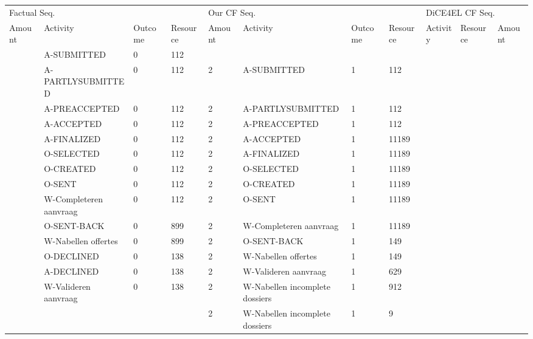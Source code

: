\begin{tabular}{lllllllllll}
\toprule
\multicolumn{4}{l}{Factual Seq.} & \multicolumn{4}{l}{Our CF Seq.} & \multicolumn{3}{l}{DiCE4EL CF Seq.} \\
Amount & Activity & Outcome & Resource & Amount & Activity & Outcome & Resource & Activity & Resource & Amount \\
\midrule
 & A-SUBMITTED & 0 & 112 &  &  &  &  &  &  &  \\
 & A-PARTLYSUBMITTED & 0 & 112 & 2 & A-SUBMITTED & 1 & 112 &  &  &  \\
 & A-PREACCEPTED & 0 & 112 & 2 & A-PARTLYSUBMITTED & 1 & 112 &  &  &  \\
 & A-ACCEPTED & 0 & 112 & 2 & A-PREACCEPTED & 1 & 112 &  &  &  \\
 & A-FINALIZED & 0 & 112 & 2 & A-ACCEPTED & 1 & 11189 &  &  &  \\
 & O-SELECTED & 0 & 112 & 2 & A-FINALIZED & 1 & 11189 &  &  &  \\
 & O-CREATED & 0 & 112 & 2 & O-SELECTED & 1 & 11189 &  &  &  \\
 & O-SENT & 0 & 112 & 2 & O-CREATED & 1 & 11189 &  &  &  \\
 & W-Completeren aanvraag & 0 & 112 & 2 & O-SENT & 1 & 11189 &  &  &  \\
 & O-SENT-BACK & 0 & 899 & 2 & W-Completeren aanvraag & 1 & 11189 &  &  &  \\
 & W-Nabellen offertes & 0 & 899 & 2 & O-SENT-BACK & 1 & 149 &  &  &  \\
 & O-DECLINED & 0 & 138 & 2 & W-Nabellen offertes & 1 & 149 &  &  &  \\
 & A-DECLINED & 0 & 138 & 2 & W-Valideren aanvraag & 1 & 629 &  &  &  \\
 & W-Valideren aanvraag & 0 & 138 & 2 & W-Nabellen incomplete dossiers & 1 & 912 &  &  &  \\
 &  &  &  & 2 & W-Nabellen incomplete dossiers & 1 & 9 &  &  &  \\
\bottomrule
\end{tabular}
